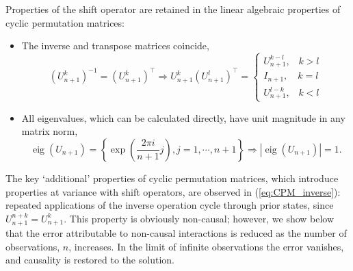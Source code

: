 \documentclass[12pt, twoside, draft]{article}
\begin{document}
Properties of the shift operator are retained in the linear algebraic properties of cyclic permutation matrices:
\begin{itemize}
\item The inverse and transpose matrices coincide,
\begin{equation}\label{eq:CPM_inverse}
\left( U_{n+1}^k \right)^{-1} = \left( U_{n+1}^k \right)^\top \Rightarrow U_{n+1}^k \left( U_{n+1}^l \right)^\top = 
\begin{cases}
U_{n+1}^{k-l}, \hspace{10pt} k > l \\
I_{n+1}, \hspace{12pt} k = l \\
U_{n+1}^{l-k}, \hspace{10pt} k < l
\end{cases}
\end{equation}
\item All eigenvalues, which can be calculated directly, have unit magnitude in any matrix norm,
\begin{equation}\label{eq:CPM_eigenvalues}
\operatorname{eig} \left( U_{n+1} \right) = \left\{ \exp \left( \frac{2 \pi i}{n+1} j \right), j = 1, \cdots, n+1 \right\} \Rightarrow \left| \operatorname{eig} ( U_{n+1}) \right| = 1.
\end{equation}
\end{itemize}
The key `additional' properties of cyclic permutation matrices, which introduce properties at variance with shift operators, are observed in (\ref{eq:CPM_inverse}): repeated applications of the inverse operation cycle through prior states, since $U_{n+1}^{n+k} = U_{n+1}^k$.  This property is obviously non-causal; however, we show below that the error attributable to non-causal interactions is reduced as the number of observations, $n$, increases. In the limit of infinite observations the error vanishes, and causality is restored to the solution.
\end{document}
